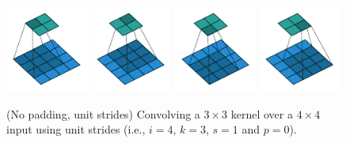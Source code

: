 \documentclass[notitlepage]{report}
\begin{document}
\begin{figure}[p]
    \centering
    \includegraphics[width=0.24\textwidth]{pdf/no_padding_no_strides_00.pdf}
    \includegraphics[width=0.24\textwidth]{pdf/no_padding_no_strides_01.pdf}
    \includegraphics[width=0.24\textwidth]{pdf/no_padding_no_strides_02.pdf}
    \includegraphics[width=0.24\textwidth]{pdf/no_padding_no_strides_03.pdf}
    \caption{\label{fig:no_padding_no_strides} (No padding, unit strides)
        Convolving a $3 \times 3$ kernel over a $4 \times 4$ input using unit
        strides (i.e., $i = 4$, $k = 3$, $s = 1$ and $p = 0$).}
\end{figure}
\end{document}
